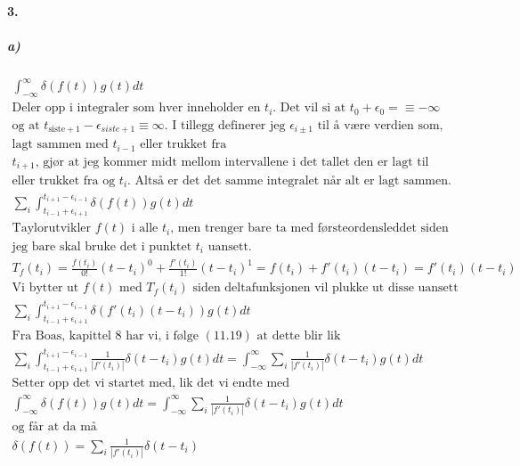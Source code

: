 \documentclass[11pt, A4paper,norsk]{article}
\begin{document}
\clearpage
		\paragraph{3.}
			\subparagraph{a)}
				\begin{gather*}
\int_{- \infty}^{\infty} \delta(f(t)) g(t) dt \\
\text{Deler opp i integraler som hver inneholder en $t_i$. Det vil si at $t_{0} + \epsilon_{0} =\equiv - \infty$} \\
\text{og at $t_{\text{siste} + 1} - \epsilon_{siste + 1} \equiv \infty$. I tillegg definerer jeg $\epsilon_{i \pm 1}$ til å være verdien som,} \\
\text{lagt sammen med $t_{i - 1}$ eller trukket fra} \\
\text{$t_{i + 1}$, gjør at jeg kommer midt mellom intervallene i det tallet den er lagt til} \\
\text{eller trukket fra og $t_i$. Altså er det det samme integralet når alt er lagt sammen.} \\
\sum_{i} \int_{t_{i - 1} + \epsilon_{i + 1}}^{t_{i + 1} - \epsilon_{i - 1}} \delta(f(t)) g(t) dt \\
\text{Taylorutvikler $f(t)$ i alle $t_i$, men trenger bare ta med førsteordensleddet siden} \\
\text{jeg bare skal bruke det i punktet $t_i$ uansett.} \\
T_{f}(t_i) = \frac{f(t_i)}{0!} (t - t_i)^{0} + \frac{f'(t_i)}{1!} (t - t_i)^{1} = f(t_i) + f'(t_i) (t - t_i) = f'(t_i) (t - t_i) \\
\text{Vi bytter ut $f(t)$ med $T_{f}(t_i)$ siden deltafunksjonen vil plukke ut disse uansett} \\
\sum_{i} \int_{t_{i - 1} + \epsilon_{i + 1}}^{t_{i + 1} - \epsilon_{i - 1}} \delta(f'(t_i) (t - t_i)) g(t) dt \\
\text{Fra Boas, kapittel 8 har vi, i følge $(11.19)$ at dette blir lik} \\
\sum_{i} \int_{t_{i - 1} + \epsilon_{i + 1}}^{t_{i + 1} - \epsilon_{i - 1}} \frac{1}{|f'(t_i)|}\delta(t - t_i) g(t) dt = \int_{- \infty}^{\infty} \sum_{i} \frac{1}{|f'(t_i)|}\delta(t - t_i) g(t) dt \\
\text{Setter opp det vi startet med, lik det vi endte med} \\
\int_{- \infty}^{\infty} \delta(f(t)) g(t) dt = \int_{- \infty}^{\infty} \sum_{i} \frac{1}{|f'(t_i)|}\delta(t - t_i) g(t) dt \\
\text{og får at da må} \\
\delta(f(t)) = \sum_{i} \frac{1}{|f'(t_i)|}\delta(t - t_i)
				\end{gather*}
\end{document}
